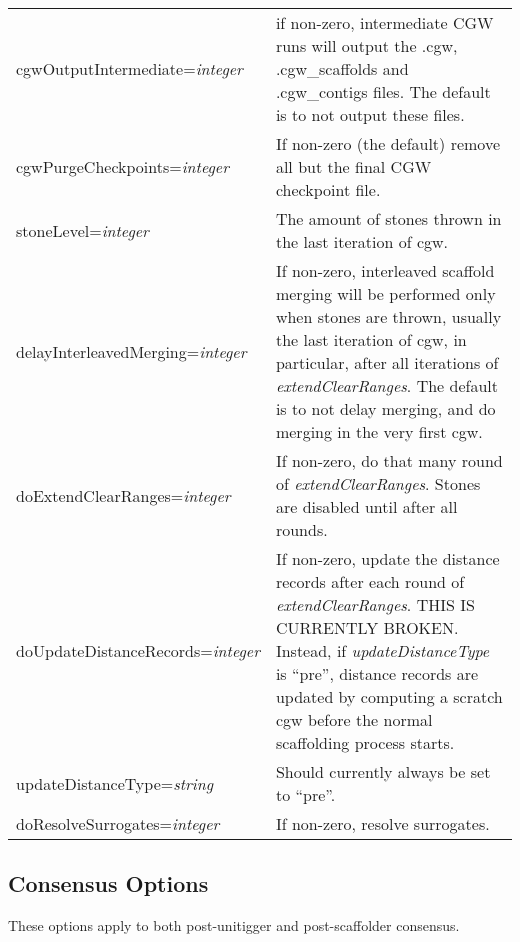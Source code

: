\documentclass[twoside,11pt]{article}
\begin{document}
\begin{longtable}{lp{3.0in}}

cgwOutputIntermediate={\it integer} &
if non-zero, intermediate CGW runs will output the .cgw,
.cgw_scaffolds and .cgw_contigs files.  The default is to not output
these files.
\\

cgwPurgeCheckpoints={\it integer} &
If non-zero (the default) remove all but the final CGW checkpoint file.
\\

stoneLevel={\it integer} &
The amount of stones thrown in the last iteration of cgw.
\\

delayInterleavedMerging={\it integer} &
If non-zero, interleaved scaffold merging will be performed only when
stones are thrown, usually the last iteration of cgw, in particular,
after all iterations of {\it extendClearRanges}.  The default is to
not delay merging, and do merging in the very first cgw.
\\

doExtendClearRanges={\it integer} &
If non-zero, do that many round of {\it extendClearRanges}.  Stones are disabled
until after all rounds.
\\

doUpdateDistanceRecords={\it integer} &
If non-zero, update the distance records after each round of {\it extendClearRanges}.  THIS IS
CURRENTLY BROKEN.  Instead, if {\it updateDistanceType} is ``pre'', distance records are
updated by computing a scratch cgw before the normal scaffolding process starts.
\\

updateDistanceType={\it string} &
Should currently always be set to ``pre''.
\\

doResolveSurrogates={\it integer} &
If non-zero, resolve surrogates.
\\
\end{longtable}



\subsection{Consensus Options}

These options apply to both post-unitigger and post-scaffolder consensus.
\end{document}
